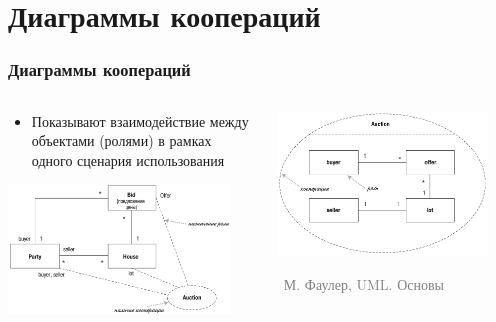 \documentclass[xetex,mathserif,serif]{beamer}
\newcommand{\attribution}[1] {
	\vspace{-5mm}\begin{flushright}\begin{scriptsize}\textcolor{gray}{\textcopyright\, #1}\end{scriptsize}\end{flushright}
}
\begin{document}
	\section{Диаграммы коопераций}

	\begin{frame}
		\frametitle{Диаграммы коопераций}
		\begin{columns}
			\begin{column}{0.5\textwidth}
				\begin{itemize}
					\item Показывают взаимодействие между объектами (ролями) в рамках одного сценария использования
				\end{itemize}
				\vspace{3mm}
				\begin{center}
					\includegraphics[width=0.9\textwidth]{cooperationAlternateNotation.png}
				\end{center}
			\end{column}
			\begin{column}{0.5\textwidth}
				\begin{center}
					\includegraphics[width=0.9\textwidth]{cooperationDiagram.png}
					\attribution{М. Фаулер, UML. Основы}
				\end{center}
			\end{column}
		\end{columns}
	\end{frame}
\end{document}
